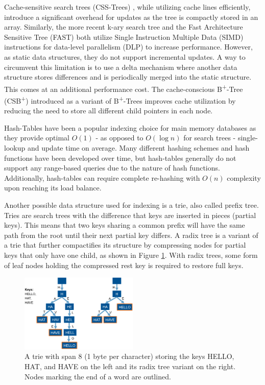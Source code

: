 \documentclass[acmtog, nonacm]{acmart}
\begin{document}
Cache-sensitive search trees (CSS-Trees) \cite{rao1998cache}, while utilizing cache lines efficiently, 
introduce a significant overhead for updates as the tree is compactly stored in an array. 
Similarly, the more recent k-ary search tree \cite{10.1145/1565694.1565705} and the Fast Architecture 
Sensitive Tree (FAST) \cite{10.1145/1807167.1807206} both utilize Single Instruction Multiple Data (SIMD) 
instructions for data-level parallelism (DLP) to increase performance. However, as static data 
structures, they do not support incremental updates. A way to circumvent this limitation is to 
use a delta mechanism where another data structure stores differences and is periodically merged 
into the static structure. This comes at an additional performance cost. The cache-conscious 
B\textsuperscript{+}-Tree (CSB\textsuperscript{+}) \cite{10.1145/342009.335449} introduced as a variant of 
B\textsuperscript{+}-Trees improves cache utilization by reducing the need to store all different 
child pointers in each node.

Hash-Tables have been a popular indexing choice for main memory databases as they provide 
optimal $O(1)$ - as opposed to $O(\log n)$ for search trees - single-lookup and update 
time on average. Many different hashing schemes and hash functions have been developed 
over time, but hash-tables generally do not support any range-based queries due to the nature 
of hash functions. Additionally, hash-tables can require complete re-hashing with $O(n)$ complexity 
upon reaching its load balance.

Another possible data structure used for indexing is a trie, also called prefix tree. Tries are search trees 
with the difference that keys are inserted in pieces (partial keys). This means that two keys sharing a common
prefix will have the same path from the root until their next partial key differs. A radix tree is a variant of
a trie that further compactifies its structure by compressing nodes for partial keys that only have one child, as 
shown in Figure \ref{fig:trie}. With radix trees, some form of leaf nodes holding the compressed rest key is required 
to restore full keys.

\begin{figure}
    \centering
    \includegraphics[width=0.5\textwidth]{images/01-trie-radix-tree-example.PNG}
    \caption{A trie with span 8 (1 byte per character) storing the keys HELLO, HAT, and HAVE on the left and its radix tree variant on the right. Nodes marking the end of a word are outlined.}
    \label{fig:trie}
\end{figure}
\end{document}

